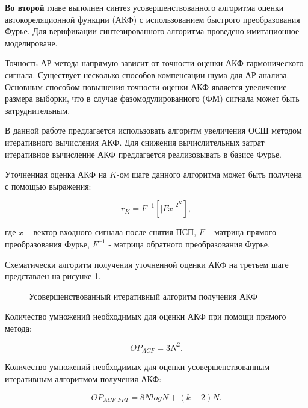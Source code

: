 {\bf{Во второй}} главе выполнен синтез усовершенствованного алгоритма оценки автокореляционной функции (АКФ) с использованием
быстрого преобразования Фурье. Для верификации синтезированного алгоритма проведено имитационное моделироване.

Точность АР метода напрямую зависит от точности оценки АКФ гармонического сигнала.
Существует несколько способов компенсации шума для АР анализа.
Основным способом повышения точности оценки АКФ является увеличение размера выборки, что в случае фазомодулированного (ФМ) сигнала может быть затруднительным. 

В данной работе предлагается использовать алгоритм увеличения ОСШ методом итеративного вычисления АКФ.
Для снижения вычислительных затрат итеративное вычисление АКФ предлагается реализовывать в базисе Фурье. 

Уточненная оценка АКФ на ${K}$-ом шаге данного алгоритма может быть получена с помощью выражения:
\begin{center}
\begin{equation}
	\label{eq:akf_3}
	\hat{r}_K = F^{-1}\left[ \left| Fx \right| ^{2^K} \right],
\end{equation}
\end{center}
где ${x}$ – вектор входного сигнала после снятия ПСП, ${F}$ – матрица прямого преобразования Фурье,
${F^{-1}}$ - матрица обратного преобразования Фурье.

Схематически алгоритм получения уточненной оценки АКФ на третьем шаге представлен на рисунке \ref{pic:akf_pic}.
\begin{figure}[h]
	\center{}
	\caption{Усовершенствованный итеративный алгоритм получения АКФ}
	\label{pic:akf_pic}
\end{figure}

Количество умножений необходимых для оценки АКФ при помощи прямого метода:
\begin{center}
\begin{equation}
	OP_{ACF} = 3N^2.
\end{equation}
\end{center}

Количество умножений необходимых для оценки усовершенствованным итеративным алгоритмом получения АКФ: \begin{center}
\begin{equation}
	OP_{ACF\_FFT} = 8NlogN + (k+2)N.
\end{equation}
\end{center}

